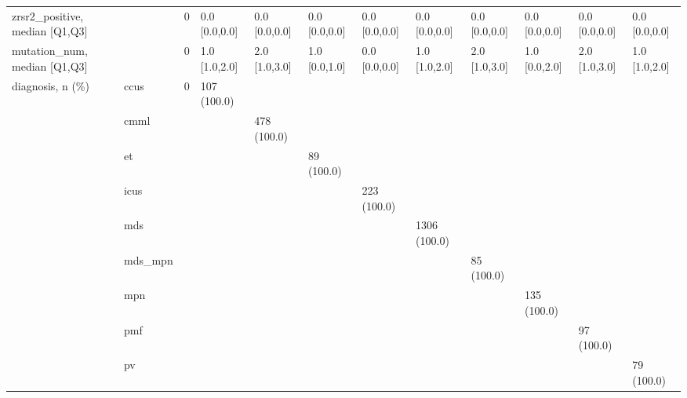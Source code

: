 \begin{tabular}{llllllllllll}
zrsr2\_positive, median [Q1,Q3] &    &                    0 &       0.0 [0.0,0.0] &      0.0 [0.0,0.0] &        0.0 [0.0,0.0] &       0.0 [0.0,0.0] &     0.0 [0.0,0.0] &     0.0 [0.0,0.0] &     0.0 [0.0,0.0] &       0.0 [0.0,0.0] &        0.0 [0.0,0.0] \\
mutation\_num, median [Q1,Q3] &    &                    0 &       1.0 [1.0,2.0] &      2.0 [1.0,3.0] &        1.0 [0.0,1.0] &       0.0 [0.0,0.0] &     1.0 [1.0,2.0] &     2.0 [1.0,3.0] &     1.0 [0.0,2.0] &       2.0 [1.0,3.0] &        1.0 [1.0,2.0] \\
diagnosis, n (\%) & ccus &                    0 &         107 (100.0) &                    &                      &                     &                   &                   &                   &                     &                      \\
                 & cmml &                      &                     &        478 (100.0) &                      &                     &                   &                   &                   &                     &                      \\
                 & et &                      &                     &                    &           89 (100.0) &                     &                   &                   &                   &                     &                      \\
                 & icus &                      &                     &                    &                      &         223 (100.0) &                   &                   &                   &                     &                      \\
                 & mds &                      &                     &                    &                      &                     &      1306 (100.0) &                   &                   &                     &                      \\
                 & mds\_mpn &                      &                     &                    &                      &                     &                   &        85 (100.0) &                   &                     &                      \\
                 & mpn &                      &                     &                    &                      &                     &                   &                   &       135 (100.0) &                     &                      \\
                 & pmf &                      &                     &                    &                      &                     &                   &                   &                   &          97 (100.0) &                      \\
                 & pv &                      &                     &                    &                      &                     &                   &                   &                   &                     &           79 (100.0) \\
\bottomrule
\end{tabular}
